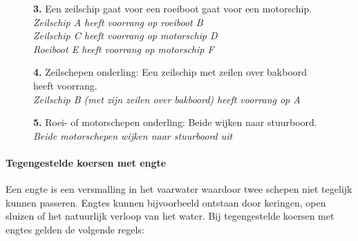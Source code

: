\begin{figure}[H]
	\centering
	\begin{minipage}[t]{0.70\textwidth}
		\textbf{3.} Een zeilschip gaat voor een roeiboot gaat voor een motorschip.\\
		\textit{Zeilschip A heeft voorrang op roeiboot B \\
				Zeilschip C heeft voorrang op motorschip D \\
				Roeiboot E heeft voorrang op motorschip F}
	\end{minipage}
	\hfill
	\begin{minipage}[t]{0.25\textwidth}
		\label{pic:tg3a}
	\end{minipage}
	\hfill
\end{figure}
\vspace{-0.7cm}

\begin{figure}[H]
	\centering
	\begin{minipage}[t]{0.70\textwidth}
		\textbf{4.} Zeilschepen onderling: Een zeilschip met zeilen over bakboord heeft voorrang.\\
		\textit{Zeilschip B (met zijn zeilen over bakboord) heeft voorrang op A}
	\end{minipage}
	\hfill
	\begin{minipage}[t]{0.25\textwidth}
		\label{pic:tg4}
	\end{minipage}
	\hfill
\end{figure}
\vspace{-0.7cm}

\begin{figure}[H]
	\centering
	\begin{minipage}[t]{0.70\textwidth}
		\textbf{5.} Roei- of motorschepen onderling: Beide wijken naar stuurboord.\\
		\textit{Beide motorschepen wijken naar stuurboord uit}
	\end{minipage}
	\hfill
	\begin{minipage}[t]{0.25\textwidth}
		\label{pic:tg5}
	\end{minipage}
	\hfill
\end{figure}

\paragraph{Tegengestelde koersen met engte}
Een engte is een versmalling in het vaarwater waardoor twee schepen niet tegelijk kunnen passeren. Engtes kunnen bijvoorbeeld ontstaan door keringen, open sluizen of het natuurlijk verloop van het water. Bij tegengestelde koersen met engtes gelden de volgende regels:

